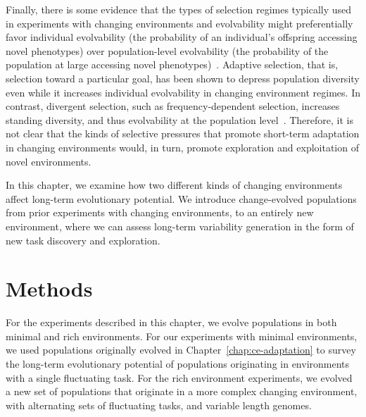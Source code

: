\documentclass[PhD]{msu-thesis}
\begin{document}
Finally, there is some evidence that the types of selection regimes typically used in experiments with changing environments and evolvability might preferentially favor individual evolvability (the probability of an individual's offspring accessing novel phenotypes) over population-level evolvability (the probability of the population at large accessing novel phenotypes)~\cite{wilder_reconciling_2015,lehman_critical_2016}. Adaptive selection, that is, selection toward a particular goal, has been shown to depress population diversity even while it increases individual evolvability in changing environment regimes. In contrast, divergent selection, such as frequency-dependent selection, increases standing diversity, and thus evolvability at the population level~\cite{wilder_reconciling_2015}. Therefore, it is not clear that the kinds of selective pressures that promote short-term adaptation in changing environments would, in turn, promote exploration and exploitation of novel environments.

In this chapter, we examine how two different kinds of changing environments affect long-term evolutionary potential. We introduce change-evolved populations from prior experiments with changing environments, to an entirely new environment, where we can assess long-term variability generation in the form of new task discovery and exploration.

\section{Methods}
For the experiments described in this chapter, we evolve populations in both minimal and rich environments. 
For our experiments with minimal environments, we used populations originally evolved in Chapter~\ref{chap:ce-adaptation} to survey the long-term evolutionary potential of populations originating in environments with a single fluctuating task. For the rich environment experiments, we %
evolved a new set of populations that originate in a more complex changing environment, with alternating sets of fluctuating tasks, and variable length genomes.
\end{document}
